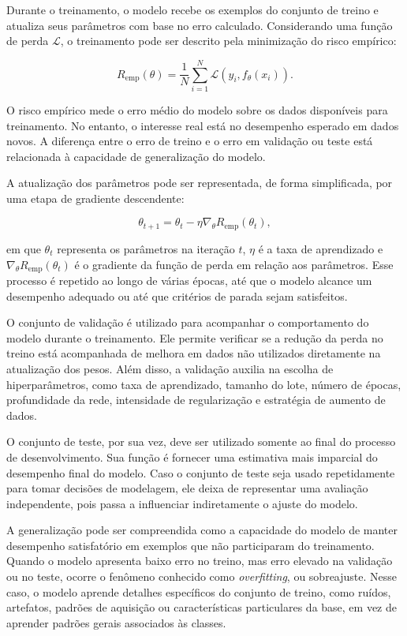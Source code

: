 \documentclass[
    12pt,
    openright,
    oneside,
    a4paper,
    english,
    brazil
]{abntex2}
\begin{document}
Durante o treinamento, o modelo recebe os exemplos do conjunto de treino e atualiza seus parâmetros com base no erro calculado. Considerando uma função de perda \(\mathcal{L}\), o treinamento pode ser descrito pela minimização do risco empírico:

\[
R_{\text{emp}}(\theta)
=
\frac{1}{N}
\sum_{i=1}^{N}
\mathcal{L}(y_i, f_{\theta}(x_i)).
\]

O risco empírico mede o erro médio do modelo sobre os dados disponíveis para treinamento. No entanto, o interesse real está no desempenho esperado em dados novos. A diferença entre o erro de treino e o erro em validação ou teste está relacionada à capacidade de generalização do modelo.

A atualização dos parâmetros pode ser representada, de forma simplificada, por uma etapa de gradiente descendente:

\[
\theta_{t+1}
=
\theta_t
-
\eta
\nabla_{\theta}
R_{\text{emp}}(\theta_t),
\]

em que \(\theta_t\) representa os parâmetros na iteração \(t\), \(\eta\) é a taxa de aprendizado e \(\nabla_{\theta}R_{\text{emp}}(\theta_t)\) é o gradiente da função de perda em relação aos parâmetros. Esse processo é repetido ao longo de várias épocas, até que o modelo alcance um desempenho adequado ou até que critérios de parada sejam satisfeitos.

O conjunto de validação é utilizado para acompanhar o comportamento do modelo durante o treinamento. Ele permite verificar se a redução da perda no treino está acompanhada de melhora em dados não utilizados diretamente na atualização dos pesos. Além disso, a validação auxilia na escolha de hiperparâmetros, como taxa de aprendizado, tamanho do lote, número de épocas, profundidade da rede, intensidade de regularização e estratégia de aumento de dados.

O conjunto de teste, por sua vez, deve ser utilizado somente ao final do processo de desenvolvimento. Sua função é fornecer uma estimativa mais imparcial do desempenho final do modelo. Caso o conjunto de teste seja usado repetidamente para tomar decisões de modelagem, ele deixa de representar uma avaliação independente, pois passa a influenciar indiretamente o ajuste do modelo.

A generalização pode ser compreendida como a capacidade do modelo de manter desempenho satisfatório em exemplos que não participaram do treinamento. Quando o modelo apresenta baixo erro no treino, mas erro elevado na validação ou no teste, ocorre o fenômeno conhecido como \textit{overfitting}, ou sobreajuste. Nesse caso, o modelo aprende detalhes específicos do conjunto de treino, como ruídos, artefatos, padrões de aquisição ou características particulares da base, em vez de aprender padrões gerais associados às classes.
\end{document}
